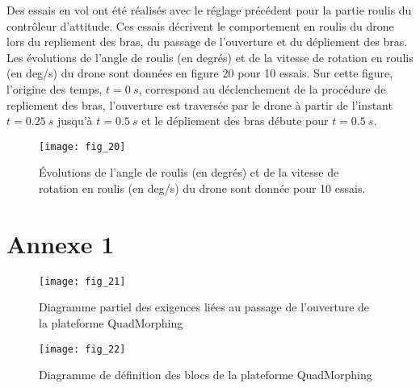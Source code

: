 \ifprof
\begin{corrige}
\end{corrige}
\else
\fi

Des essais en vol ont été réalisés avec le réglage précédent pour la partie roulis du contrôleur
d’attitude. Ces essais décrivent le comportement en roulis du drone lors du repliement des
bras, du passage de l’ouverture et du dépliement des bras. Les évolutions de l’angle de
roulis (en degrés) et de la vitesse de rotation en roulis (en \si{deg/s}) du drone sont données
en figure 20 pour 10 essais. Sur cette figure, l’origine des temps, $t = \SI{0}{s}$, correspond au
déclenchement de la procédure de repliement des bras, l’ouverture est traversée par le drone
à partir de l’instant $t = \SI{0,25}{s}$ jusqu’à $t = \SI{0,5}{s}$ et le dépliement des bras débute pour $t = \SI{0,5}{s}$.

\begin{figure}[H]
\centering
\texttt{[image: fig\_20]}
\caption{\label{fig_ccinppsi2022:20} ­Évolutions de l’angle de roulis (en degrés) et de la vitesse de rotation en roulis
(en \si{deg/s}) du drone sont donnée pour 10 essais.}
\end{figure}

\ifprof
\begin{corrige}
\end{corrige}
\else
\fi


\newpage

\section*{Annexe 1}


\begin{figure}[H]
\centering
\texttt{[image: fig\_21]}
\caption{\label{fig_ccinppsi2022:21} Diagramme partiel des exigences liées au passage de l’ouverture de la plateforme QuadMorphing}
\end{figure}

\begin{figure}[H]
\centering
\texttt{[image: fig\_22]}
\caption{\label{fig_ccinppsi2022:22} Diagramme de définition des blocs de la plateforme QuadMorphing}
\end{figure}
